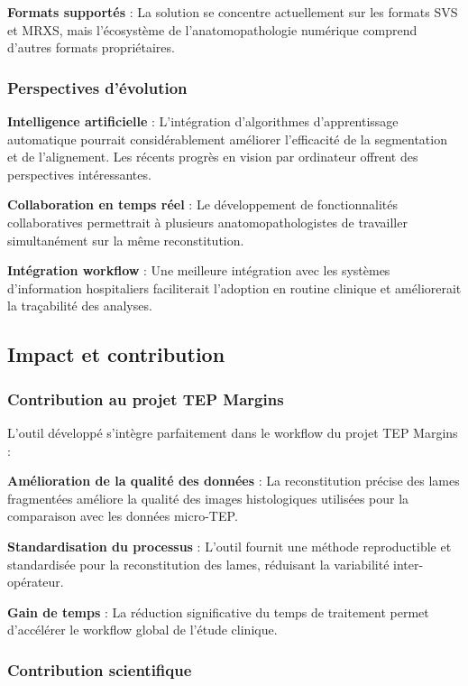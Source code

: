 \documentclass[12pt,a4paper]{report}
\begin{document}
\textbf{Formats supportés} : La solution se concentre actuellement sur les formats SVS et MRXS, mais l'écosystème de l'anatomopathologie numérique comprend d'autres formats propriétaires.

\subsubsection{Perspectives d'évolution}

\textbf{Intelligence artificielle} : L'intégration d'algorithmes d'apprentissage automatique pourrait considérablement améliorer l'efficacité de la segmentation et de l'alignement. Les récents progrès en vision par ordinateur offrent des perspectives intéressantes.

\textbf{Collaboration en temps réel} : Le développement de fonctionnalités collaboratives permettrait à plusieurs anatomopathologistes de travailler simultanément sur la même reconstitution.

\textbf{Intégration workflow} : Une meilleure intégration avec les systèmes d'information hospitaliers faciliterait l'adoption en routine clinique et améliorerait la traçabilité des analyses.

\subsection{Impact et contribution}

\subsubsection{Contribution au projet TEP Margins}

L'outil développé s'intègre parfaitement dans le workflow du projet TEP Margins :

\textbf{Amélioration de la qualité des données} : La reconstitution précise des lames fragmentées améliore la qualité des images histologiques utilisées pour la comparaison avec les données micro-TEP.

\textbf{Standardisation du processus} : L'outil fournit une méthode reproductible et standardisée pour la reconstitution des lames, réduisant la variabilité inter-opérateur.

\textbf{Gain de temps} : La réduction significative du temps de traitement permet d'accélérer le workflow global de l'étude clinique.

\subsubsection{Contribution scientifique}
\end{document}
